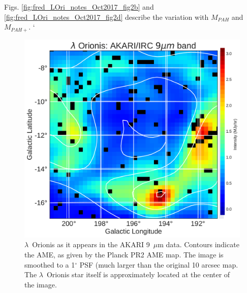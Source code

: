           Figs. \ref{fig:fred_LOri_notes_Oct2017_fig2b} and \ref{fig:fred_LOri_notes_Oct2017_fig2d} describe the variation with $M_{PAH}$ and $M_{PAH+}$.
`



  \begin{figure}

    \includegraphics[width=\textwidth]{../Plots/LOri_akari9_AMEcont_1dres.pdf}
    \centering
    \caption{$\lambda$~Orionis as it appears in the AKARI 9~$\mu$m data. Contours indicate the AME, as given by the Planck PR2 AME map. The image is smoothed to a 1$^{\circ}$ PSF (much larger than the original 10 arcsec map. The $\lambda$~Orionis star itself is approximately located at the center of the image.
    }
    \label{fig:orionis-akari9}
  \end{figure}


